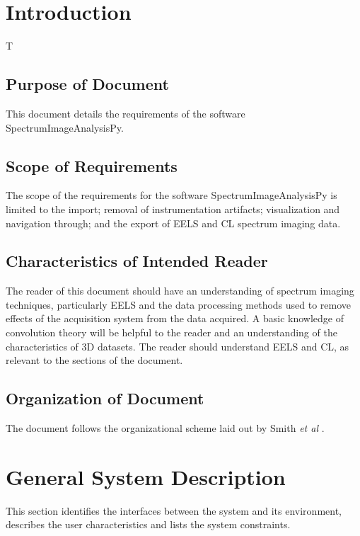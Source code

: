 \documentclass[12pt]{article}
\newcommand{\progname}{SpectrumImageAnalysisPy} %
\begin{document}

\newpage
{}

\section{Introduction}
T

\subsection{Purpose of Document}

This document details the requirements of the software \progname{}.

\subsection{Scope of Requirements} 
The scope of the requirements for the software \progname{} is limited to the import; removal of instrumentation artifacts; visualization and navigation through; and the export of EELS and CL spectrum imaging data.

\subsection{Characteristics of Intended Reader} 
The reader of this document should have an understanding of spectrum imaging techniques, particularly EELS and the data processing methods used to remove effects of the acquisition system from the data acquired. A basic knowledge of convolution theory will be helpful to the reader and an understanding of the characteristics of 3D datasets. The reader should understand EELS and CL, as relevant to the sections of the document.

\subsection{Organization of Document}

The document follows the organizational scheme laid out by Smith \textit{et al} \cite{SmithAndLai2005, smith_requirements_2007}.

\section{General System Description}

This section identifies the interfaces between the system and its environment,
describes the user characteristics and lists the system constraints.
\end{document}
